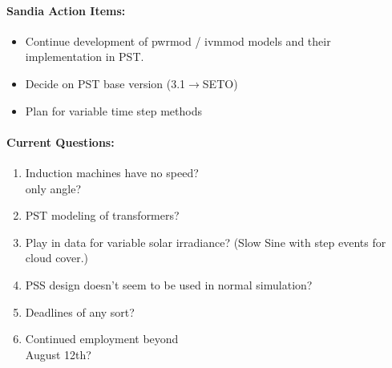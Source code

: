 \documentclass[12pt]{article}
\begin{document}
\begin{multicols}{2}
\paragraph{Sandia Action Items:}
	\begin{itemize}
		\itemsep 0em 
			\item Continue development of pwrmod / ivmmod models and their implementation in PST.
			\item Decide on PST base version (3.1$\longrightarrow$SETO)
			\item Plan for variable time step methods
	\end{itemize}
	
\paragraph{Current Questions:}
	\begin{enumerate}
	\itemsep0em 
	
	
	\item Induction machines have no speed?\\ only angle?
	\item PST modeling of transformers?
	\item Play in data for variable solar irradiance? (Slow Sine with step events for cloud cover.)
	\item PSS design doesn't seem to be used in normal simulation?
	\item Deadlines of any sort?
	\item Continued employment beyond \\August 12th?
	\end{enumerate}

\vfill\null
\columnbreak

	

\end{multicols}
\end{document}
